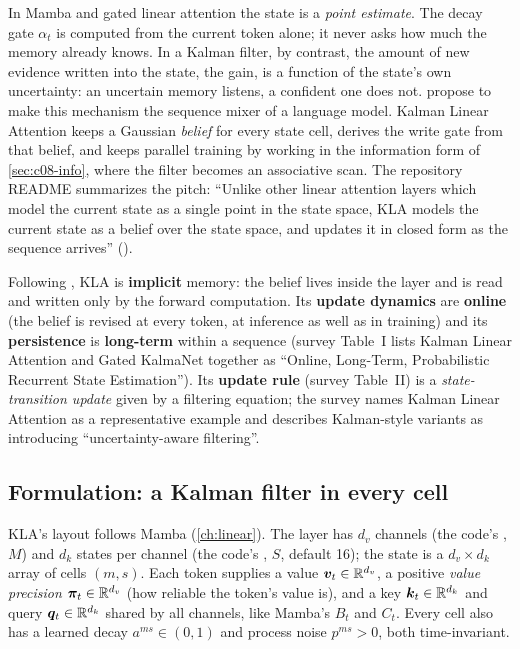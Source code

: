 In Mamba and gated linear attention the state is a \emph{point estimate}. The decay gate
$\alpha_t$ is computed from the current token alone; it never asks how much the memory already
knows. In a Kalman filter, by contrast, the amount of new evidence written into the state, the
gain, is a function of the state's own uncertainty: an uncertain memory listens, a confident one
does not.  propose to make this mechanism the sequence mixer of a language
model. Kalman Linear Attention keeps a Gaussian \emph{belief} for every state cell, derives the
write gate from that belief, and keeps parallel training by working in the information form of
\cref{sec:c08-info}, where the filter becomes an associative scan. The repository README
summarizes the pitch: ``Unlike other linear attention layers which model the current state as a
single point in the state space, KLA models the current state as a belief over the state space,
and updates it in closed form as the sequence arrives''
().

\begin{taxonomy}
Following \citet{zhoubian2026memory}, KLA is \textbf{implicit} memory: the belief lives inside the
layer and is read and written only by the forward computation. Its \textbf{update dynamics} are
\textbf{online} (the belief is revised at every token, at inference as well as in training) and its
\textbf{persistence} is \textbf{long-term} within a sequence (survey Table~I lists Kalman Linear
Attention and Gated KalmaNet together as ``Online, Long-Term, Probabilistic Recurrent State
Estimation''). Its \textbf{update rule} (survey Table~II) is a \emph{state-transition update} given
by a filtering equation; the survey names Kalman Linear Attention as a representative example and
describes Kalman-style variants as introducing ``uncertainty-aware filtering''.
\end{taxonomy}

\subsection{Formulation: a Kalman filter in every cell}\label{sec:c08-kla-form}

KLA's layout follows Mamba (\cref{ch:linear}). The layer has $d_v$ channels (the code's
, $M$) and $d_k$ states per channel (the code's , $S$, default 16); the
state is a $d_v\times d_k$ array of cells $(m,s)$. Each token supplies a value $\bm{v}_t\in\mathbb{R}^{d_v}$, a
positive \emph{value precision} $\bm{\pi}_t\in\mathbb{R}^{d_v}$ (how reliable the token's value is), and a
key $\bm{k}_t\in\mathbb{R}^{d_k}$ and query $\bm{q}_t\in\mathbb{R}^{d_k}$ shared by all channels, like Mamba's $B_t$ and
$C_t$. Every cell also has a learned decay $a^{ms}\in(0,1)$ and process noise $p^{ms}>0$, both
time-invariant.

